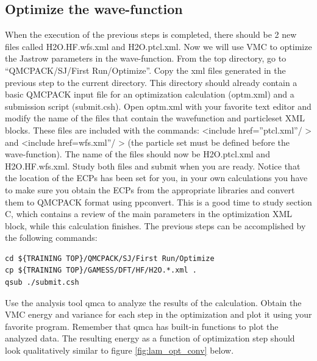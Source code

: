 \subsection{Optimize the wave-function}
When the execution of the previous steps is completed, there should be 2 new
files called H2O.HF.wfs.xml and H2O.ptcl.xml. Now we will use VMC to optimize the 
Jastrow parameters in the wave-function.  From the top directory, go to
``QMCPACK/SJ/First Run/Optimize''. Copy the xml files generated in the previous step
to the current directory. This directory should already contain a basic QMCPACK input
file for an optimization calculation (optm.xml) and a submission script (submit.csh). Open
optm.xml with your favorite text editor and modify the name of the files that contain the
wavefunction and particleset XML blocks. These files are included with the commands:
<include href=”ptcl.xml”/ > and <include href=wfs.xml”/ > (the particle set must be
defined before the wave-function). The name of the files should now be H2O.ptcl.xml
and H2O.HF.wfs.xml. Study both files and submit when you are ready. Notice that the
location of the ECPs has been set for you, in your own calculations you have to make
sure you obtain the ECPs from the appropriate libraries and convert them to QMCPACK
format using ppconvert. This is a good time to study section C, which contains a review
of the main parameters in the optimization XML block, while this calculation finishes. The
previous steps can be accomplished by the following commands:
\begin{shaded}
\begin{verbatim}
cd ${TRAINING TOP}/QMCPACK/SJ/First Run/Optimize
cp ${TRAINING TOP}/GAMESS/DFT/HF/H2O.*.xml .
qsub ./submit.csh
\end{verbatim}
\end{shaded}

Use the analysis tool qmca to analyze the results of the calculation. Obtain the VMC
energy and variance for each step in the optimization and plot it using your favorite program.
Remember that qmca has built-in functions to plot the analyzed data. The resulting energy
as a function of optimization step should look qualitatively similar to figure \ref{fig:lam_opt_conv} below.

